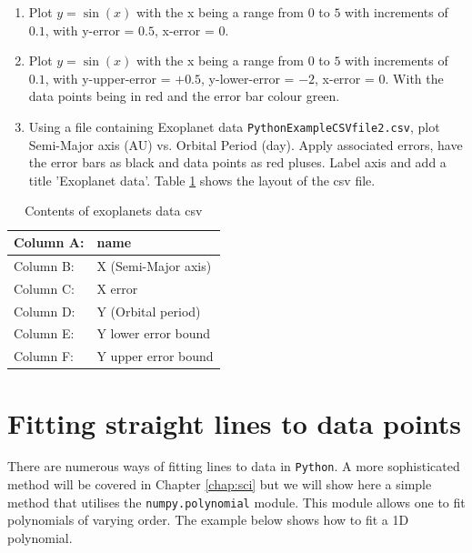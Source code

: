 \begin{enumerate}
    \item Plot $y=\sin(x)$ with the x being a range from $0$ to $5$ with increments of $0.1$, with y-error = $0.5$, x-error = $0$.
    \item Plot $y=\sin(x)$ with the x being a range from $0$ to $5$ with increments of $0.1$, with y-upper-error = $+0.5$, y-lower-error = $-2$, x-error = $0$.  With the data points being in red and the error bar colour green.
    \item Using a file containing Exoplanet data \texttt{PythonExampleCSVfile2.csv}, plot Semi-Major axis (AU) vs. Orbital Period (day). Apply associated errors, have the error bars as black and data points as red pluses. Label axis and add a title 'Exoplanet data'. Table \ref{tab:exop} shows the layout of the csv file.
\end{enumerate}


\begin{table}[H]
\begin{center}
\caption{Contents of exoplanets data csv}
\begin{tabular}{|l|l|}
\hline
Column A:& name\\\hline
Column B:& X (Semi-Major axis)\\\hline
Column C:& X error\\\hline
Column D:& Y (Orbital period)\\\hline
Column E:& Y lower error bound\\\hline
Column F:& Y upper error bound\\\hline
\end{tabular}
\label{tab:exop}
\end{center}
\end{table}\vspace*{-3ex}

\newpage

\section{Fitting straight lines to data points}
\label{linefit}

There are numerous ways of fitting lines to data in \texttt{Python}. A more sophisticated method will be covered in Chapter \ref{chap:sci} but we will show here a simple method that utilises the \texttt{numpy.polynomial} module. This module allows one to fit polynomials of varying order.  The example below shows how to fit a 1D polynomial.

